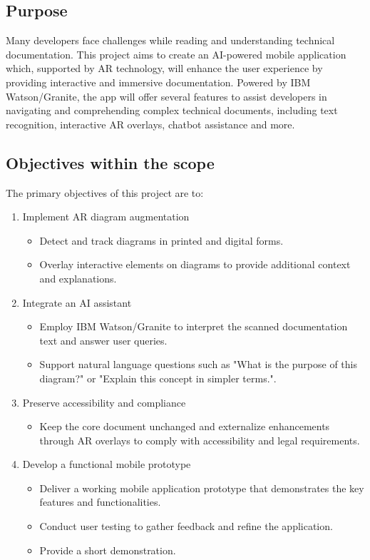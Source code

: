 \documentclass[12pt]{article}
\begin{document}
    \subsection{Purpose}
    Many developers face challenges while reading and understanding technical documentation. This project aims to create an AI-powered mobile application which, supported by AR technology, will enhance the user experience
    by providing interactive and immersive documentation. Powered by IBM Watson/Granite, the app will offer several features to assist developers in navigating and comprehending complex technical documents, including text recognition,
    interactive AR overlays, chatbot assistance and more.

    \subsection{Objectives within the scope}
    The primary objectives of this project are to:
    \begin{enumerate}
        \item Implement AR diagram augmentation
        \begin{itemize}
            \item Detect and track diagrams in printed and digital forms.
            \item Overlay interactive elements on diagrams to provide additional context and explanations.
        \end{itemize}
        \item Integrate an AI assistant
        \begin{itemize}
            	\item Employ IBM Watson/Granite to interpret the scanned documentation text and answer user queries.
            	\item Support natural language questions such as "What is the purpose of this diagram?" or "Explain this concept in simpler terms.".
        \end{itemize}
    \item Preserve accessibility and compliance
        \begin{itemize}
            \item Keep the core document unchanged and externalize enhancements through AR overlays to comply with accessibility and legal requirements.
        \end{itemize}
        \item Develop a functional mobile prototype
        \begin{itemize}
            \item Deliver a working mobile application prototype that demonstrates the key features and functionalities.
            \item Conduct user testing to gather feedback and refine the application.
            \item Provide a short demonstration.
        \end{itemize}
        \end{enumerate}
\end{document}
